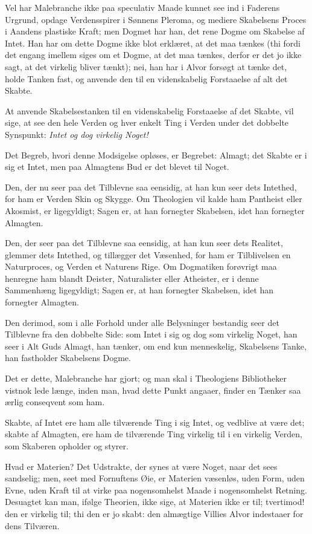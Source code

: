 \documentclass[12pt,a4paper]{article}
\newcommand{\opage}[1]{\marginnote{\footnotesize\textit{[#1]}}}
\begin{document}
Vel har Malebranche ikke paa speculativ Maade kunnet see ind
\opage{23} i Faderens Urgrund, opdage Verdensspirer i Sønnens Pleroma, og mediere
Skabelsens Proces i Aandens plastiske Kraft; men Dogmet har han, det rene Dogme
om Skabelse af Intet. Han har om dette Dogme ikke blot erklæret, at det maa
tænkes (thi fordi det engang imellem siges om et Dogme, at det maa tænkes,
derfor er det jo ikke sagt, at det virkelig bliver tænkt); nei, han har i Alvor
forsøgt at tænke det, holde Tanken fast, og anvende den til en videnskabelig
Forstaaelse af alt det Skabte.

At anvende Skabelsestanken til en videnskabelig Forstaaelse af det Skabte, vil
sige, at see den hele Verden og hver enkelt Ting i Verden under det dobbelte
Synspunkt: \emph{Intet og dog virkelig Noget!}

Det Begreb, hvori denne Modsigelse opløses, er Begrebet: Almagt; det Skabte er i
sig et Intet, men paa Almagtens Bud er det blevet til Noget.

Den, der nu seer paa det Tilblevne saa eensidig, at han kun seer dets Intethed,
for ham er Verden Skin og Skygge. Om Theologien vil kalde ham Pantheist eller
Akosmist, er ligegyldigt; Sagen er, at han fornegter Skabelsen, idet han
fornegter Almagten.

Den, der seer paa det Tilblevne saa eensidig, at han kun seer dets Realitet,
glemmer dets Intethed, og tillægger det Væsenhed, for ham er Tilblivelsen en
Naturproces, og Verden et Naturens Rige. Om Dogmatiken forøvrigt maa henregne ham
blandt Deister, Naturalister eller Atheister, er i denne Sammenhæng ligegyldigt;
Sagen er, at han fornegter Skabelsen, idet han fornegter Almagten.

Den derimod, som i alle Forhold under alle Belysninger bestandig seer det
Tilblevne fra den dobbelte Side: som Intet i sig og dog som virkelig Noget, han
seer i Alt Guds Almagt, han tænker, om end kun menneskelig, Skabelsens Tanke, han
fastholder Skabelsens Dogme.

Det er dette, Malebranche har gjort; og man skal i Theologiens Bibliotheker
vistnok lede længe, inden man, hvad dette Punkt angaaer, finder en Tænker saa
ærlig conseqvent som ham.

Skabte, af Intet ere ham alle tilværende Ting i sig Intet, og vedblive
\opage{24} at være det; skabte af Almagten, ere ham de tilværende Ting virkelig til i en
virkelig Verden, som Skaberen opholder og styrer.

Hvad er Materien? Det Udstrakte, der synes at være Noget, naar det sees
sandselig; men, seet med Fornuftens Øie, er Materien væsenløs, uden Form, uden
Evne, uden Kraft til at virke paa nogensomhelst Maade i nogensomhelst Retning.
Desuagtet kan man, ifølge Theorien, ikke sige, at Materien ikke er til;
tvertimod! den er virkelig til; thi den er jo skabt: den almægtige Villies Alvor
indestaaer for dens Tilværen.
\end{document}
